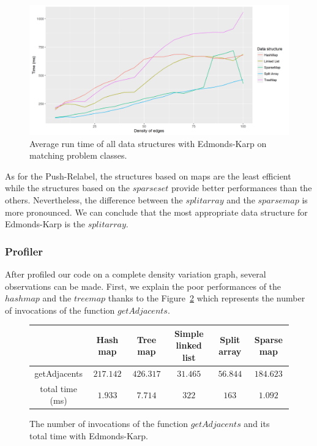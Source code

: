 \begin{figure}[H]
\begin{center}
\includegraphics[scale=0.5]{images/results/ekmeanmatching.png}
\caption{Average run time of all data structures with Edmonds-Karp on matching problem classes.}
\label{fig:ekmeanmatching}
\end{center}
\end{figure}
As for the Push-Relabel, the structures based on maps are the least efficient while the structures based on the $sparse set$ provide better performances than the others. Nevertheless, the difference between the $split array$ and the $sparse map$ is more pronounced. 
We can conclude that the most appropriate data structure for Edmonds-Karp is the $split array$.
\subsubsection{Profiler}
After profiled our code on a complete density variation graph, several observations can be made. First, we explain the poor performances of the $hashmap$ and the $treemap$ thanks to the Figure~\ref{fig:ekadja} which represents the number of invocations of the function $getAdjacents$.

\begin{figure}[H]
\centering
\begin{tabular}{|c|c|c|c|c|c|}
	\hline
     & \textbf{Hash map} & \textbf{Tree map} & \textbf{Simple linked list} & \textbf{Split array} & \textbf{Sparse map}\\
     \hline	
   getAdjacents & $217.142$ & $426.317$ & $31.465$ & $56.844$ & $184.623$ \\
   total time (ms) & $1.933$ & $7.714$ & $322$ & $163$ & $1.092$ \\
   \hline
\end{tabular}
\caption{The number of invocations of the function $getAdjacents$ and its total time with Edmonds-Karp.}
\label{fig:ekadja} 
\end{figure}

